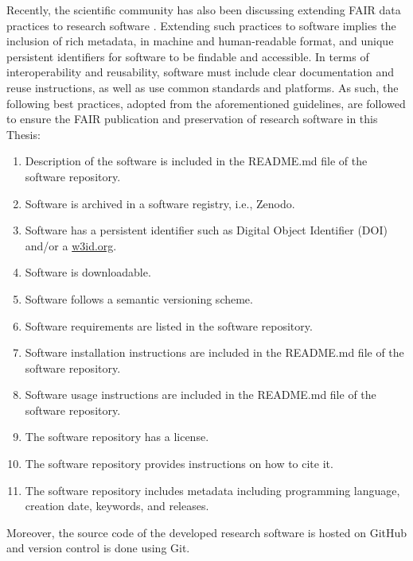 Recently, the scientific community has also been discussing extending FAIR data practices to research software  \citep{martinez_top_2019,gruenpeter_d44_2024}.
Extending such practices to software implies the inclusion of rich metadata, in machine and human-readable format, and unique persistent identifiers for software to be findable and accessible.
In terms of interoperability and reusability, software must include clear documentation and reuse instructions, as well as use common standards and platforms.
As such, the following best practices, adopted from the aforementioned guidelines, are followed to ensure the FAIR publication and preservation of research software in this Thesis:

\begin{enumerate}
    \item Description of the software is included in the README.md file of the software repository. 
    \item Software is archived in a software registry, i.e., Zenodo.
    \item Software has a persistent identifier such as Digital Object Identifier (DOI) and/or a \url{w3id.org}.
    \item Software is downloadable.
    \item Software follows a semantic versioning scheme.
    \item Software requirements are listed in the software repository.
    \item Software installation instructions are included in the README.md file of the software repository.
    \item Software usage instructions are included in the README.md file of the software repository.
    \item The software repository has a license.
    \item The software repository provides instructions on how to cite it.
    \item The software repository includes metadata including programming language, creation date, keywords, and releases.
\end{enumerate}

Moreover, the source code of the developed research software is hosted on GitHub and version control is done using Git.